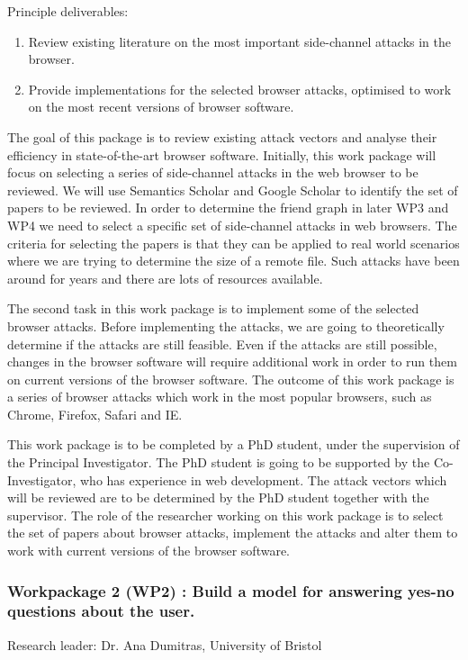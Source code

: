 \documentclass[a4paper,11pt]{article}
\begin{document}
Principle deliverables:
\begin{enumerate}
\item Review existing literature on the most important side-channel attacks in the browser.
\item Provide implementations for the selected browser attacks, optimised to work on the most recent versions of browser software.
\end{enumerate}

The goal of this package is to review existing attack vectors and analyse their efficiency in state-of-the-art browser software. Initially, this work package will focus on selecting a series of side-channel attacks in the web browser to be reviewed. We will use Semantics Scholar \cite{semanticsearch} and Google Scholar\cite{googlescholar} to identify the set of papers to be reviewed. In order to determine the friend graph in later WP3 and WP4 we need to select a specific set of side-channel attacks in web browsers. The criteria for selecting the papers is that they can be applied to real world scenarios where we are trying to determine the size of a remote file. Such attacks have been around for years and there are lots of resources available. 

The second task in this work package is to implement some of the selected browser attacks. Before implementing the attacks, we are going to theoretically determine if the attacks are still feasible. Even if the attacks are still possible, changes in the browser software will require additional work in order to run them on current versions of the browser software. The outcome of this work package is a series of browser attacks which work in the most popular browsers, such as Chrome, Firefox, Safari and IE. 

This work package is to be completed by a PhD student, under the supervision of the Principal Investigator. The PhD student is going to be supported by the Co-Investigator, who has experience in web development. The attack vectors which will be reviewed are to be determined by the PhD student together with the supervisor. The role of the researcher working on this work package is to select the set of papers about browser attacks, implement the attacks and alter them to work with current versions of the browser software. 

\subsubsection*{Workpackage 2 (WP2) : Build a model for answering yes-no questions about the user.}
Research leader: Dr. Ana Dumitras, University of Bristol
\end{document}
